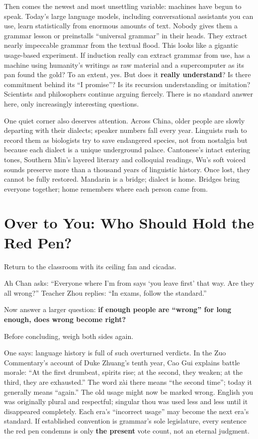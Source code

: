 Then comes the newest and most unsettling variable: machines have begun to speak. Today's large language models, including conversational assistants you can use, learn statistically from enormous amounts of text. Nobody gives them a grammar lesson or preinstalls ``universal grammar'' in their heads. They extract nearly impeccable grammar from the textual flood. This looks like a gigantic usage-based experiment. If induction really can extract grammar from use, has a machine using humanity's writings as raw material and a supercomputer as its pan found the gold? To an extent, yes. But does it \textbf{really understand}? Is there commitment behind its ``I promise''? Is its recursion understanding or imitation? Scientists and philosophers continue arguing fiercely. There is no standard answer here, only increasingly interesting questions.

One quiet corner also deserves attention. Across China, older people are slowly departing with their dialects; speaker numbers fall every year. Linguists rush to record them as biologists try to save endangered species, not from nostalgia but because each dialect is a unique underground palace. Cantonese's intact entering tones, Southern Min's layered literary and colloquial readings, Wu's soft voiced sounds preserve more than a thousand years of linguistic history. Once lost, they cannot be fully restored. Mandarin is a bridge; dialect is home. Bridges bring everyone together; home remembers where each person came from.

\section{Over to You: Who Should Hold the Red Pen?}
Return to the classroom with its ceiling fan and cicadas.

Ah Chan asks: ``Everyone where I'm from says `you leave first' that way. Are they all wrong?'' Teacher Zhou replies: ``In exams, follow the standard.''

Now answer a larger question: \textbf{if enough people are ``wrong'' for long enough, does wrong become right?}

Before concluding, weigh both sides again.

One says: language history is full of such overturned verdicts. In the Zuo Commentary's account of Duke Zhuang's tenth year, Cao Gui explains battle morale: ``At the first drumbeat, spirits rise; at the second, they weaken; at the third, they are exhausted.'' The word zài there means ``the second time''; today it generally means ``again.'' The old usage might now be marked wrong. English you was originally plural and respectful; singular thou was used less and less until it disappeared completely. Each era's ``incorrect usage'' may become the next era's standard. If established convention is grammar's sole legislature, every sentence the red pen condemns is only \textbf{the present} vote count, not an eternal judgment.

